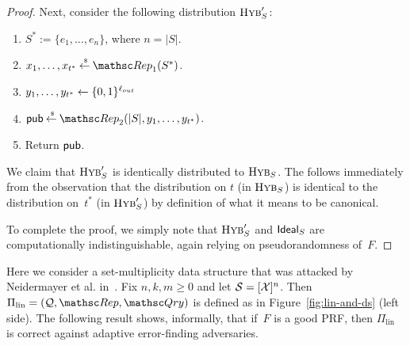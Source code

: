 \begin{proof}
Next, consider the following distribution $\mbox{{\sc Hyb}}'_S$:
\begin{enumerate}
\item $S^* := \{e_1, \ldots, e_n\}$, where $n = |S|$.
\item $x_1, \ldots, x_{t^*} \getsr \Rep_1(S^*)$.
\item $y_1, \ldots, y_{t^*} \leftarrow \{0,1\}^{\ell_{out}}$
\item $\pubaux \getsr \Rep_2(|S|, y_1, \ldots, y_{t^*})$.
\item Return ${\sf pub}$.
\end{enumerate}
We claim that $\mbox{{\sc Hyb}}'_S$ is identically distributed to $\mbox{{\sc Hyb}}_S$. The follows immediately from the
observation that the distribution on $t$ (in $\mbox{{\sc Hyb}}_S$) is identical to the distribution on~$t^*$
(in $\mbox{{\sc Hyb}}'_S$) by definition
of what it means to be canonical.

To complete the proof, we simply note that $\mbox{{\sc Hyb}}'_S$ and $\mbox{{\sf Ideal}}_S$
are computationally indistinguishable, again relying on pseudorandomness of~$F$.
\end{proof}

%






Here we consider a set-multiplicity data structure that was attacked by Neidermayer et al. in~\cite{xxx}. Fix $n,k,m \geq 0$ and let $\mathcal{S}=[{\cal X}]^n$.  Then $\Pi_{\mathrm{lin}}= (\calQ,\Rep, \Qry)$ is defined as in Figure~\ref{fig:lin-and-ds} (left side).  The following result shows, informally, that if~$F$ is a good PRF, then $\Pi_\mathrm{lin}$ is correct against adaptive error-finding adversaries.

